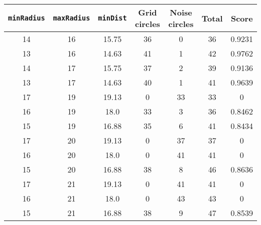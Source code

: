 \documentclass[letterpaper, 12pt]{article}
\begin{document}
\begin{longtable}{|c|c|c|c|c|c|c|}
\hline
\textbf{\texttt{minRadius}} & \textbf{\texttt{maxRadius}} & \textbf{\texttt{minDist}} & \textbf{Grid circles} & \textbf{Noise circles} & \textbf{Total} & \textbf{Score} \\
\hline
14 & 16 & 15.75 & 36 & 0 & 36 & 0.9231 \\
\hline
13 & 16 & 14.63 & 41 & 1 & 42 & 0.9762 \\
\hline
14 & 17 & 15.75 & 37 & 2 & 39 & 0.9136 \\
\hline
13 & 17 & 14.63 & 40 & 1 & 41 & 0.9639 \\
\hline
17 & 19 & 19.13 & 0 & 33 & 33 & 0 \\
\hline
16 & 19 & 18.0 & 33 & 3 & 36 & 0.8462 \\
\hline
15 & 19 & 16.88 & 35 & 6 & 41 & 0.8434 \\
\hline
17 & 20 & 19.13 & 0 & 37 & 37 & 0 \\
\hline
16 & 20 & 18.0 & 0 & 41 & 41 & 0 \\
\hline
15 & 20 & 16.88 & 38 & 8 & 46 & 0.8636 \\
\hline
17 & 21 & 19.13 & 0 & 41 & 41 & 0 \\
\hline
16 & 21 & 18.0 & 0 & 43 & 43 & 0 \\
\hline
15 & 21 & 16.88 & 38 & 9 & 47 & 0.8539 \\
\hline
\end{longtable}
\end{document}
